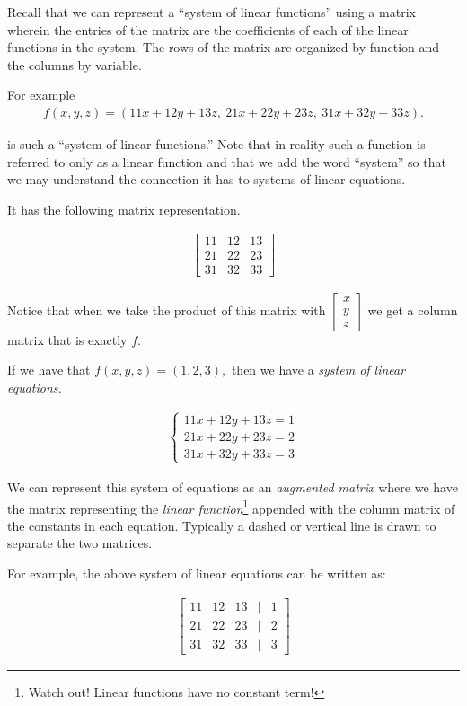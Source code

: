 Recall that we can represent a ``system of linear functions'' using a matrix wherein the entries of the matrix are the coefficients of each of the linear functions in the system. The rows of the matrix are organized by function and the columns by variable.

For example
\begin{gather*}
    f\left(x,y,z\right) = \left(
        11x +12y+13z, \
        21x+22y+23z, \
        31x+32y+33z \right).
\end{gather*}

is such a ``system of linear functions.'' Note that in reality such a function is referred to only as a linear function and that we add the word ``system'' so that we may understand the connection it has to systems of linear equations.

It has the following matrix representation.

\begin{gather*}
    \begin{bmatrix}
        11 & 12 & 13 \\
        21 & 22 & 23 \\
        31 & 32 & 33
    \end{bmatrix}
\end{gather*}

Notice that when we take the product of this matrix with \(\begin{bmatrix}
    x\\y\\z
\end{bmatrix}\) we get a column matrix that is exactly \(f.\)

If we have that \(f\left(x,y,z\right) = \left(1,2,3\right),\) then we have a \emph{system of linear equations.}

\begin{gather*}
    \begin{cases}
        11x + 12y + 13z = 1 \\
        21x + 22y + 23z = 2 \\
        31x + 32y + 33z = 3
    \end{cases}
\end{gather*}

We can represent this system of equations as an \emph{augmented matrix} where we have the matrix representing the \emph{linear function}\footnote{Watch out! Linear functions have no constant term!} appended with the column matrix of the constants in each equation. Typically a dashed or vertical line is drawn to separate the two matrices.

For example, the above system of linear equations can be written as:

\begin{gather*}
    \begin{bmatrix}
        11 & 12 & 13 & \vert & 1\\
        21 & 22 & 23 & \vert & 2\\
        31 & 32 & 33 & \vert &3
    \end{bmatrix}
\end{gather*}